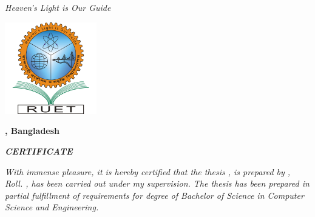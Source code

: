 \documentclass[document.tex]{subfiles}
\begin{document}

\begin{center}
\textit{Heaven's Light is Our Guide}
\vspace{1cm}

\includegraphics[height=4cm]{imgs/ruetlogo.pdf}

\vspace{1cm}
\textbf{{\fontsize{12pt}{0.5cm} \selectfont \dept}}

\vspace{0.5cm}
\textbf{{\fontsize{14pt}{0.5cm}\selectfont \ruet, Bangladesh}}

\vspace{0.5cm}
\textbf{{\fontsize{16pt}{0.5cm}\selectfont \textit{CERTIFICATE}}}

\vspace{1cm}

\end{center}

\noindent \textit{With immense pleasure, it is hereby certified that the thesis \textbf{\thesistitle}, is prepared by \textbf{\authorname},  Roll. \authorroll, has been carried out under my supervision. The thesis has been prepared in partial fulfillment of requirements for degree of Bachelor of Science in Computer Science and Engineering.}
\end{document}
